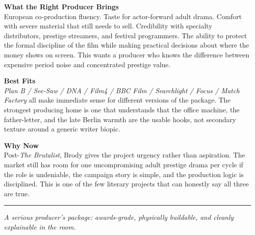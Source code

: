 \documentclass[11pt,letterpaper]{article}
\begin{document}
\vspace{2pt}

\textbf{What the Right Producer Brings}\\
European co-production fluency. Taste for actor-forward adult drama. Comfort with severe material that still needs to sell. Credibility with specialty distributors, prestige streamers, and festival programmers. The ability to protect the formal discipline of the film while making practical decisions about where the money shows on screen. This wants a producer who knows the difference between expensive period noise and concentrated prestige value.

\vspace{2pt}

\textbf{Best Fits}\\
\textit{Plan B / See-Saw / DNA / Film4 / BBC Film / Searchlight / Focus / Match Factory} all make immediate sense for different versions of the package. The strongest producing home is one that understands that the office machine, the father-letter, and the late Berlin warmth are the usable hooks, not secondary texture around a generic writer biopic.

\vspace{2pt}

\textbf{Why Now}\\
Post-\textit{The Brutalist}, Brody gives the project urgency rather than aspiration. The market still has room for one uncompromising adult prestige drama per cycle if the role is undeniable, the campaign story is simple, and the production logic is disciplined. This is one of the few literary projects that can honestly say all three are true.

\vspace{4pt}
\textcolor{sectionrule}{\rule{\textwidth}{0.5pt}}
\vspace{2pt}
\begin{center}
{\small\color{kafkalight}\textit{A serious producer's package: awards-grade, physically buildable, and cleanly explainable in the room.}}
\end{center}
\end{document}
